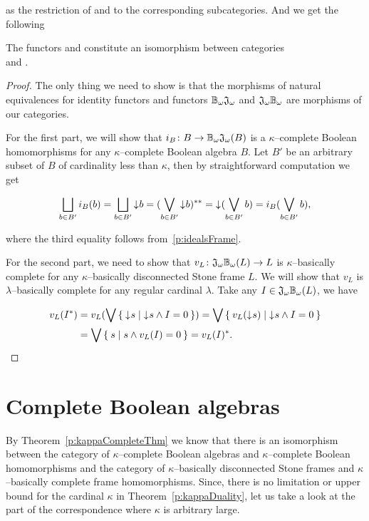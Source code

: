 \noindent as the restriction of \JO{} and \BcO{} to the corresponding subcategories. And we get the following

\begin{theorem*}\label{p:kappaDuality}
    The functors \JK{} and \BcK{} constitute an isomorphism between categories \\ \kComplBool{} and \kBDStoneFrm.
\end{theorem*}
\begin{proof}
    The only thing we need to show is that the morphisms of natural equivalences for identity functors and functors $\mathbb{B}_{\omega}\mathfrak{J}_{\omega}$ and $\mathfrak{J}_{\omega}\mathbb{B}_{\omega}$ are morphisms of our categories.

    For the first part, we will show that $i_B\colon B \to \mathbb{B}_{\omega}\mathfrak{J}_{\omega}(B)$ is a $\kappa$--complete Boolean homomorphisms for any $\kappa$--complete Boolean algebra $B$. Let $B'$ be an arbitrary subset of $B$ of cardinality less than $\kappa$, then by straightforward computation we get

    $$
        \bigsqcup_{b\in B'} i_B(b) = \bigsqcup_{b\in B'} \mathord{\downarrow}\mkern1mu b = (\bigvee_{b\in B'} \mathord{\downarrow}\mkern1mu b)^{**} = \mathord{\downarrow}\mkern1mu (\bigvee_{b\in B'} b) = i_B(\bigvee_{b\in B'} b),
    $$

    \noindent where the third equality follows from~\ref{p:idealsFrame}.

    For the second part, we need to show that $v_L\colon \mathfrak{J}_{\omega}\mathbb{B}_{\omega}(L) \to L$ is $\kappa$--basically complete for any $\kappa$--basically disconnected Stone frame $L$. We will show that $v_L$ is $\lambda$--basically complete for any regular cardinal $\lambda$. Take any $I \in \mathfrak{J}_{\omega}\mathbb{B}_{\omega}(L)$, we have

    \begin{align*}
        v_L(I^*) &= v_L(\bigvee \Set{ \mathord{\downarrow}\mkern1mus | \mathord{\downarrow}\mkern1mus \wedge I = 0 })
                  = \bigvee \Set{ v_L(\mathord{\downarrow}\mkern1mus) | \mathord{\downarrow}\mkern1mus \wedge I = 0 } \\
                 &= \bigvee \Set{ s | s \wedge v_L(I) = 0 } = v_L(I)^*.
    \end{align*}
\end{proof}


\section{Complete Boolean algebras}

By Theorem~\ref{p:kappaCompleteThm} we know that there is an isomorphism between the category of $\kappa$--complete Boolean algebras and $\kappa$--complete Boolean homomorphisms and the category of $\kappa$--basically disconnected Stone frames and $\kappa$--basically complete frame homomorphisms. Since, there is no limitation or upper bound for the cardinal $\kappa$ in Theorem~\ref{p:kappaDuality}, let us take a look at the part of the correspondence where $\kappa$ is arbitrary large.

